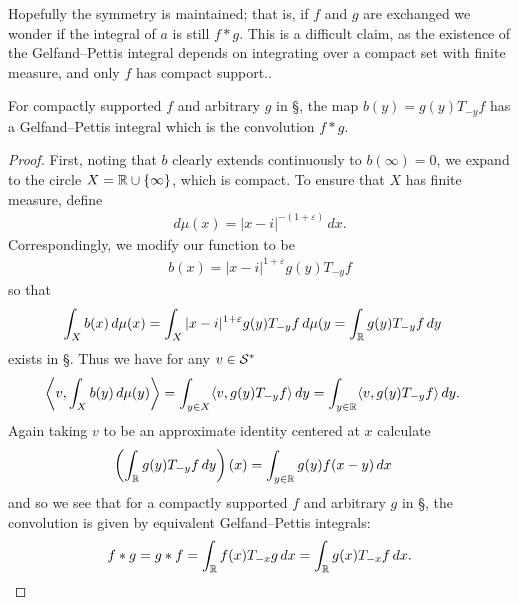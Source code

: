     Hopefully the symmetry is maintained; that is, if $f$ and $g$ are exchanged we wonder if the integral of $a$ is still $f*g$.
    This is a difficult claim, as the existence of the Gelfand--Pettis integral depends on integrating over a compact set with finite measure, and only $f$ has compact support..
    \begin{claim}
      \label{claim:GPconv}
      For compactly supported $f$ and arbitrary $g$ in \S, the map $b(y)=g(y)T_{-y}f$ has a Gelfand--Pettis integral which is the convolution $f*g$.
    \end{claim}
    \begin{proof}
      First, noting that $b$ clearly extends continuously to $b(\infty)=0$, we expand \R to the circle $X=\mathbb{R}\cup\{\infty\}$, which is compact.
      To ensure that $X$ has finite measure, define
      \begin{align*}
        d\mu(x) = |x-i|^{-(1+\varepsilon)}\,dx \text{.}
      \end{align*}
      Correspondingly, we modify our function to be
      \begin{align*}
        b(x) = |x-i|^{1+\varepsilon} g(y)T_{-y}f
      \end{align*}
      so that
      \begin{align*}
        \int_X b(x)\,d\mu(x)
        &= \int_{X} |x-i|^{1+\varepsilon} g(y)T_{-y}f\,d\mu(y
        = \int_{\mathbb{R}} g(y)T_{-y}f\,dy
      \end{align*}
      exists in \S.
      Thus we have for any $v\in\mathcal{S}^*$
      \begin{align*}
        \left\langle v, \int_X b(y)\,d\mu(y) \right\rangle
        &= \int_{y\in X} \langle v, g(y)T_{-y}f\rangle\, dy
        = \int_{y\in\mathbb{R}} \langle v, g(y)T_{-y}f\rangle\, dy \text{.}
      \end{align*}
      Again taking $v$ to be an approximate identity centered at $x$ calculate
      \begin{align*}
        \left( \int_{\mathbb{R}} g(y)T_{-y}f\,dy \right)(x)
        &= \int_{y\in\mathbb{R}} g(y)f(x-y)\,dx
      \end{align*}
      and so we see that for a compactly supported $f$ and arbitrary $g$ in \S, the convolution is given by equivalent Gelfand--Pettis integrals:
      \begin{align*}
        f*g = g*f = \int_\mathbb{R} f(x)T_{-x}g\,dx = \int_\mathbb{R} g(x)T_{-x}f\,dx \text{.}
      \end{align*}
    \end{proof}

